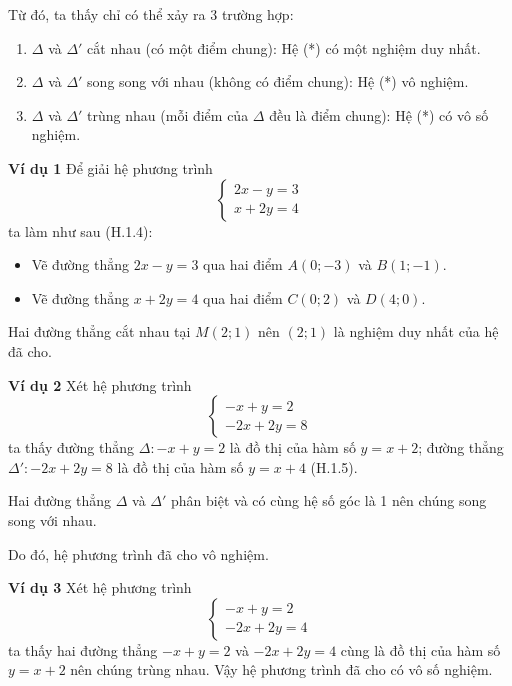 \begin{lesson}
    Từ đó, ta thấy chỉ có thể xảy ra 3 trường hợp:
    \begin{enumerate}
        \item $\Delta$ và $\Delta'$ cắt nhau (có một điểm chung): Hệ (*) có một nghiệm duy nhất.
        \item $\Delta$ và $\Delta'$ song song với nhau (không có điểm chung): Hệ (*) vô nghiệm.
        \item $\Delta$ và $\Delta'$ trùng nhau (mỗi điểm của $\Delta$ đều là điểm chung): Hệ (*) có vô số nghiệm.
    \end{enumerate}

    \textbf{Ví dụ 1} Để giải hệ phương trình
    \[
        \begin{cases}
            2x-y=3\\
            x+2y=4
        \end{cases}
    \]
    ta làm như sau (H.1.4):
    \begin{itemize}
        \item Vẽ đường thẳng $2x-y=3$ qua hai điểm $A(0;-3)$ và $B(1;-1)$.
        \item Vẽ đường thẳng $x+2y=4$ qua hai điểm $C(0;2)$ và $D(4;0)$.
    \end{itemize}

    Hai đường thẳng cắt nhau tại $M(2;1)$ nên $(2;1)$ là nghiệm duy nhất của hệ đã cho.


    \textbf{Ví dụ 2} Xét hệ phương trình
    \[
        \begin{cases}
            -x+y=2\\
            -2x+2y=8
        \end{cases}
    \]
    ta thấy đường thẳng $\Delta: -x+y=2$ là đồ thị của hàm số $y=x+2$; đường thẳng $\Delta': -2x+2y=8$ là đồ thị của hàm số $y=x+4$ (H.1.5).

    Hai đường thẳng $\Delta$ và $\Delta'$ phân biệt và có cùng hệ số góc là 1 nên chúng song song với nhau.

    Do đó, hệ phương trình đã cho vô nghiệm.


    \textbf{Ví dụ 3} Xét hệ phương trình
    \[
        \begin{cases}
            -x+y=2\\
            -2x+2y=4
        \end{cases}
    \]
    ta thấy hai đường thẳng $-x+y=2$ và $-2x+2y=4$ cùng là đồ thị của hàm số $y=x+2$ nên chúng trùng nhau. Vậy hệ phương trình đã cho có vô số nghiệm.
\end{lesson}

